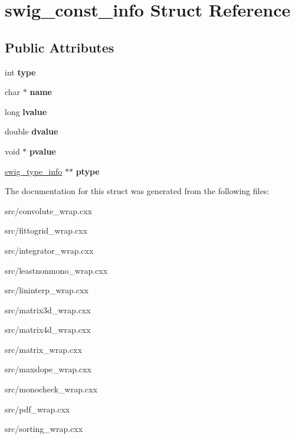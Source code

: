 \hypertarget{structswig__const__info}{
\section{swig\_\-const\_\-info Struct Reference}
\label{d6/d72/structswig__const__info}
}
\subsection*{Public Attributes}
\begin{DoxyCompactItemize}
\item 
\hypertarget{structswig__const__info_ae8bbc99e1cda11f24e306365cbf33893}{
int {\bfseries type}}
\label{d6/d72/structswig__const__info_ae8bbc99e1cda11f24e306365cbf33893}

\item 
\hypertarget{structswig__const__info_adb8a1bc6fcbfb39737a9dc72dfabf8f1}{
char $\ast$ {\bfseries name}}
\label{d6/d72/structswig__const__info_adb8a1bc6fcbfb39737a9dc72dfabf8f1}

\item 
\hypertarget{structswig__const__info_af142e4c21ad4fe61f6c2624bff034583}{
long {\bfseries lvalue}}
\label{d6/d72/structswig__const__info_af142e4c21ad4fe61f6c2624bff034583}

\item 
\hypertarget{structswig__const__info_a74e477f1dbf515bcb7e2ef07a1d34c35}{
double {\bfseries dvalue}}
\label{d6/d72/structswig__const__info_a74e477f1dbf515bcb7e2ef07a1d34c35}

\item 
\hypertarget{structswig__const__info_a37585059046a4951907eb779c97e7cc8}{
void $\ast$ {\bfseries pvalue}}
\label{d6/d72/structswig__const__info_a37585059046a4951907eb779c97e7cc8}

\item 
\hypertarget{structswig__const__info_a374efde326bb281d91791c91306e3f08}{
\hyperlink{structswig__type__info}{swig\_\-type\_\-info} $\ast$$\ast$ {\bfseries ptype}}
\label{d6/d72/structswig__const__info_a374efde326bb281d91791c91306e3f08}

\end{DoxyCompactItemize}


The documentation for this struct was generated from the following files:\begin{DoxyCompactItemize}
\item 
src/convolute\_\-wrap.cxx\item 
src/fittogrid\_\-wrap.cxx\item 
src/integrator\_\-wrap.cxx\item 
src/leastnonmono\_\-wrap.cxx\item 
src/lininterp\_\-wrap.cxx\item 
src/matrix3d\_\-wrap.cxx\item 
src/matrix4d\_\-wrap.cxx\item 
src/matrix\_\-wrap.cxx\item 
src/maxslope\_\-wrap.cxx\item 
src/monocheck\_\-wrap.cxx\item 
src/pdf\_\-wrap.cxx\item 
src/sorting\_\-wrap.cxx\end{DoxyCompactItemize}
